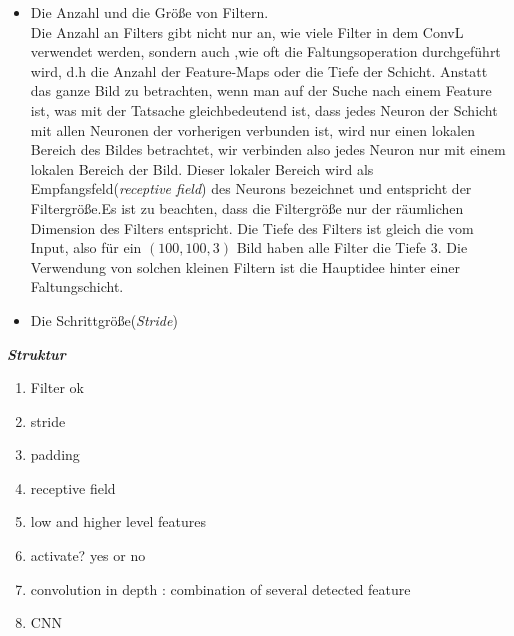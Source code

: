 \documentclass[12pt,a4paper]{scrartcl}
\numberwithin{equation}{section}
\begin{document}
\begin{itemize}
	\item Die Anzahl und die Größe von Filtern.\\
	Die Anzahl an Filters gibt nicht nur an, wie viele Filter in dem \ac{ConvL} verwendet werden, sondern auch ,wie oft die  Faltungsoperation durchgeführt wird, d.h die Anzahl der Feature-Maps oder die Tiefe der Schicht.
	Anstatt das ganze Bild zu betrachten, wenn man auf der Suche nach einem Feature ist, was mit der Tatsache gleichbedeutend ist, dass jedes Neuron der Schicht mit allen Neuronen der vorherigen verbunden ist, wird nur einen lokalen Bereich des Bildes betrachtet, wir verbinden also jedes Neuron nur mit einem lokalen Bereich der Bild. Dieser lokaler Bereich wird als Empfangsfeld(\emph{receptive field}) des Neurons bezeichnet und entspricht der Filtergröße.Es ist zu beachten, dass die Filtergröße nur der räumlichen Dimension des Filters entspricht. Die Tiefe des Filters ist gleich die vom Input, also für ein $ (100, 100, 3) $ Bild haben alle Filter die Tiefe $ 3 $.	
	Die Verwendung von solchen kleinen Filtern ist die Hauptidee hinter einer Faltungschicht.
	
	\item Die Schrittgröße(\emph{Stride})\\
	
\end{itemize}
\textbf{\emph{Struktur}}
\begin{enumerate}
	\item Filter ok
	\item stride
	\item padding
	\item receptive field
	\item low and higher level features
	\item activate? yes or no
	\item convolution in depth : combination of several detected feature
	\item CNN
\end{enumerate}
\end{document}
